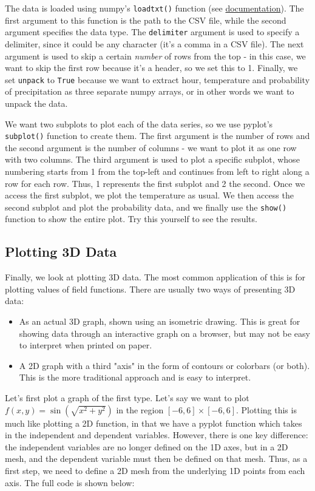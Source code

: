 \documentclass[12pt]{article}
\newcommand{\code}{\texttt}
\begin{document}
The data is loaded using numpy's \code{loadtxt()} function (see \href{https://docs.scipy.org/doc/numpy/reference/generated/numpy.loadtxt.html}{documentation}). The first argument to this function is the path to the CSV file, while the second argument specifies the data type. The \code{delimiter} argument is used to specify a delimiter, since it could be any character (it's a comma in a CSV file). The next argument is used to skip a certain \textit{number} of rows from the top - in this case, we want to skip the first row because it's a header, so we set this to 1. Finally, we set \code{unpack} to \code{True} because we want to extract hour, temperature and probability of precipitation as three separate numpy arrays, or in other words we want to unpack the data.

We want two subplots to plot each of the data series, so we use pyplot's \code{subplot()} function to create them. The first argument is the number of rows and the second argument is the number of columns - we want to plot it as one row with two columns. The third argument is used to plot a specific subplot, whose numbering starts from 1 from the top-left and continues from left to right along a row for each row. Thus, 1 represents the first subplot and 2 the second. Once we access the first subplot, we plot the temperature as usual. We then access the second subplot and plot the probability data, and we finally use the \code{show()} function to show the entire plot. Try this yourself to see the results.

\subsection{Plotting 3D Data}
Finally, we look at plotting 3D data. The most common application of this is for plotting values of field functions. There are usually two ways of presenting 3D data: 

\begin{itemize}
	\item As an actual 3D graph, shown using an isometric drawing. This is great for showing data through an interactive graph on a browser, but may not be easy to interpret when printed on paper.
	\item A 2D graph with a third "axis" in the form of contours or colorbars (or both). This is the more traditional approach and is easy to interpret.
\end{itemize}

Let's first plot a graph of the first type. Let's say we want to plot $f(x,y)=\sin(\sqrt{x^2+y^2})$ in the region $[-6,6] \times [-6,6]$. Plotting this is much like plotting a 2D function, in that we have a pyplot function which takes in the independent and dependent variables. However, there is one key difference: the independent variables are no longer defined on the 1D axes, but in a 2D mesh, and the dependent variable must then be defined on that mesh. Thus, as a first step, we need to define a 2D mesh from the underlying 1D points from each axis. The full code is shown below:
\end{document}
